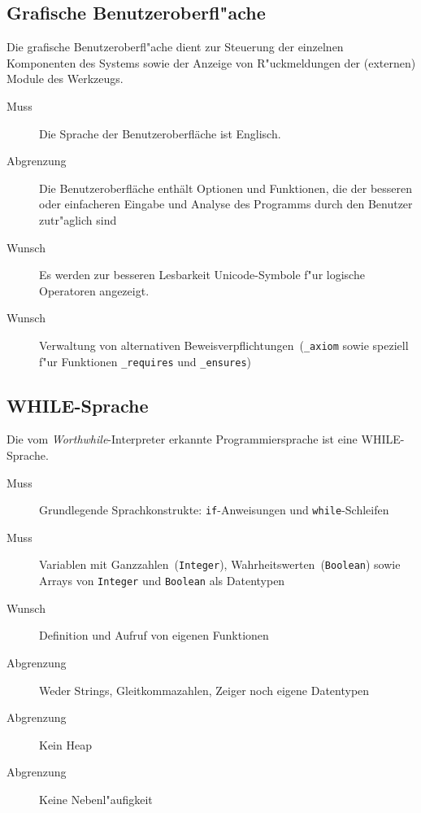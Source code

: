 \subsection{Grafische Benutzeroberfl"ache}%

Die grafische Benutzeroberfl"ache dient zur Steuerung der einzelnen Komponenten des Systems sowie der Anzeige von R"uckmeldungen der (externen) \see Module des Werkzeugs.%

\begin{description}%
    \item [Muss] Die Sprache der Benutzeroberfläche ist Englisch.%
    \item [Abgrenzung] Die Benutzeroberfläche enthält Optionen und Funktionen, die der besseren oder einfacheren Eingabe und Analyse des Programms durch den Benutzer zutr"aglich sind%
    \item [Wunsch] Es werden zur besseren Lesbarkeit \see Unicode-Symbole f"ur \see logische Operatoren angezeigt.%
    \item [Wunsch] Verwaltung von alternativen \see Beweisverpflichtungen~(\texttt{\_axiom} sowie speziell f"ur Funktionen \texttt{\_requires} und \texttt{\_ensures})%
\end{description}%

\subsection{WHILE-Sprache}%

Die vom \textit{Worthwhile}-Interpreter erkannte Programmiersprache ist eine \see WHILE-Sprache.%

\begin{description}%
    \item [Muss] Grundlegende Sprachkonstrukte: \texttt{if}-Anweisungen und \texttt{while}-Schleifen%
    \item [Muss] Variablen mit Ganzzahlen~(\texttt{Integer}), Wahrheitswerten~(\texttt{Boolean}) sowie Arrays von \texttt{Integer} und \texttt{Boolean} als Datentypen%
    \item [Wunsch] Definition und Aufruf von eigenen Funktionen%
    \item [Abgrenzung] Weder Strings, Gleitkommazahlen, Zeiger noch eigene Datentypen%
    \item [Abgrenzung] Kein \see Heap%
    \item [Abgrenzung] Keine \see Nebenl"aufigkeit%
\end{description}%

